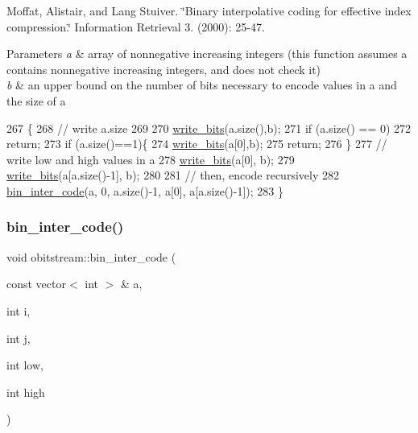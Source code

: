Moffat, Alistair, and Lang Stuiver. \char`\"{}\+Binary interpolative coding for effective index compression.\char`\"{} Information Retrieval 3. (2000)\+: 25-\/47.


\begin{DoxyParams}{Parameters}
{\em a} & array of nonnegative increasing integers (this function assumes a contains nonnegative increasing integers, and does not check it) \\
\hline
{\em b} & an upper bound on the number of bits necessary to encode values in a and the size of a \\
\hline
\end{DoxyParams}

\begin{DoxyCode}
267                                                           \{
268   \textcolor{comment}{// write a.size}
269 
270   \hyperlink{classobitstream_afb0cc2fb4f739881436d887bd4770355}{write\_bits}(a.size(),b);
271   \textcolor{keywordflow}{if} (a.size() == 0)
272     \textcolor{keywordflow}{return};
273   \textcolor{keywordflow}{if} (a.size()==1)\{
274     \hyperlink{classobitstream_afb0cc2fb4f739881436d887bd4770355}{write\_bits}(a[0],b);
275     \textcolor{keywordflow}{return};
276   \}
277   \textcolor{comment}{// write low and high values in a}
278   \hyperlink{classobitstream_afb0cc2fb4f739881436d887bd4770355}{write\_bits}(a[0], b);
279   \hyperlink{classobitstream_afb0cc2fb4f739881436d887bd4770355}{write\_bits}(a[a.size()-1], b);
280 
281   \textcolor{comment}{// then, encode recursively}
282   \hyperlink{classobitstream_a945c237be04936240953ba927486cde1}{bin\_inter\_code}(a, 0, a.size()-1, a[0], a[a.size()-1]);
283 \}
\end{DoxyCode}
\mbox{\label{classobitstream_aae355189c570d0fb7c3aa01ee3e71d8a}} 
\subsubsection{\texorpdfstring{bin\+\_\+inter\+\_\+code()}{bin\_inter\_code()}\hspace{0.1cm}{\footnotesize\ttfamily [2/2]}}
{\footnotesize\ttfamily void obitstream\+::bin\+\_\+inter\+\_\+code (\begin{DoxyParamCaption}\item[{const vector$<$ int $>$ \&}]{a,  }\item[{int}]{i,  }\item[{int}]{j,  }\item[{int}]{low,  }\item[{int}]{high }\end{DoxyParamCaption})}



